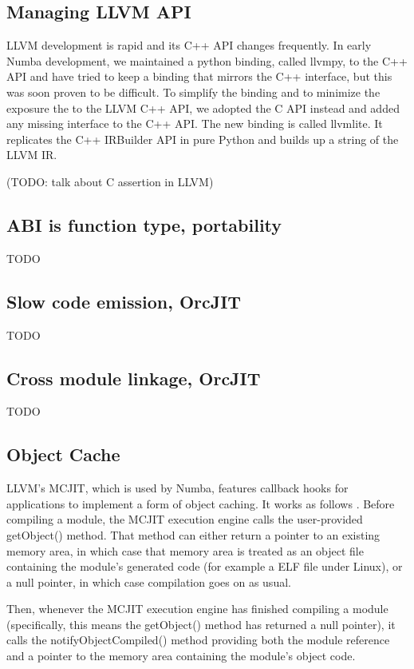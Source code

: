 \documentclass{acm_proc_article-sp}
\begin{document}
\subsection{Managing LLVM API}

LLVM development is rapid and its C++ API changes frequently.
In early Numba development, we maintained a python binding, called llvmpy,
to the C++ API and have tried to keep a binding that mirrors the C++ interface,
but this was soon proven to be difficult.
To simplify the binding and to minimize the exposure the to the LLVM C++ API,
we adopted the C API instead and added any missing interface to the C++ API.
The new binding is called llvmlite.  It replicates the C++ IRBuilder API in
pure Python and builds up a string of the LLVM IR.

(TODO: talk about C assertion in LLVM)

\subsection{ABI is function type, portability}

TODO

\subsection{Slow code emission, OrcJIT}

TODO

\subsection{Cross module linkage, OrcJIT}

TODO

\subsection{Object Cache}

LLVM's MCJIT, which is used by Numba, features callback hooks for
applications to implement a form of object caching.  It works
as follows \cite{llvmdoc:objectcache}.
Before compiling a module, the MCJIT execution engine
calls the user-provided getObject() method.  That method can either
return a pointer to an existing memory area, in which case that
memory area is treated as an object file containing the module's
generated code (for example a ELF file under Linux), or a null pointer,
in which case compilation goes on as usual.

Then, whenever the MCJIT execution engine has finished compiling a
module (specifically, this means the getObject() method has returned
a null pointer), it calls the notifyObjectCompiled() method providing
both the module reference and a pointer to the memory area containing
the module's object code.
\end{document}
